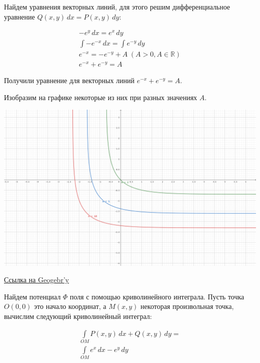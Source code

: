 \bigskip

Найдем уравнения векторных линий, для этого решим дифференциальное уравнение
\(Q(x, y)\,dx = P(x, y)\,dy\):

\begin{equation*}\begin{split}
    -e^y\,dx = e^x\,dy \\
    \int -e^{-x}\,dx = \int e^{-y}\,dy \\
    e^{-x} = -e^{-y} + A \hspace{3pt} (A > 0, A \in \mathbb{R})\\
    e^{-x} + e^{-y} = A
  \end{split}\end{equation*}

Получили уравнение для векторных линий \(e^{-x} + e^{-y} = A\).

Изобразим на графике некоторые из них при разных значениях \(A\).

\includegraphics[width=\textwidth]{images/t02_p01.png}

\href{https://www.geogebra.org/calculator/zkyy7zap}{Ссылка на Geogebr'y}

\bigskip

Найдем потенциал \(\Phi\) поля с помощью криволинейного интеграла. Пусть точка
\(O(0, 0)\) это начало координат, а \(M(x, y)\) некоторая произвольная точка,
вычислим следующий криволинейный интеграл:

\begin{equation*}\begin{split}
    \int\limits_{OM} P(x, y)\,dx + Q(x, y)\,dy = \\
    \int\limits_{OM} e^x \,dx - e^y \,dy
  \end{split}\end{equation*}


